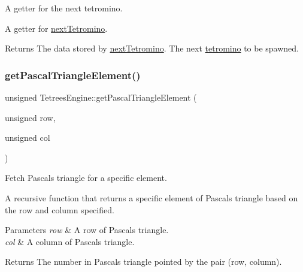 A getter for the next tetromino. 

A getter for \hyperlink{classTetreesEngine_a44c902481f5d8a72ca8a78d24f5c3a33}{next\+Tetromino}. \begin{DoxyReturn}{Returns}
The data stored by \hyperlink{classTetreesEngine_a44c902481f5d8a72ca8a78d24f5c3a33}{next\+Tetromino}. The next \hyperlink{TetreesDefs_8hpp_adf4f8e2cbbd7d8894fe3beda39db1b8f}{tetromino} to be spawned. 
\end{DoxyReturn}
\mbox{\label{classTetreesEngine_a087f12761b955478bff1d4e70e6c0549}} 
\subsubsection{\texorpdfstring{get\+Pascal\+Triangle\+Element()}{getPascalTriangleElement()}}
{\footnotesize\ttfamily unsigned Tetrees\+Engine\+::get\+Pascal\+Triangle\+Element (\begin{DoxyParamCaption}\item[{unsigned}]{row,  }\item[{unsigned}]{col }\end{DoxyParamCaption})\hspace{0.3cm}{\ttfamily [private]}}



Fetch Pascal\textquotesingle{}s triangle for a specific element. 

A recursive function that returns a specific element of Pascal\textquotesingle{}s triangle based on the row and column specified. 
\begin{DoxyParams}{Parameters}
{\em row} & A row of Pascal\textquotesingle{}s triangle. \\
\hline
{\em col} & A column of Pascal\textquotesingle{}s triangle. \\
\hline
\end{DoxyParams}
\begin{DoxyReturn}{Returns}
The number in Pascal\textquotesingle{}s triangle pointed by the pair (row, column). 
\end{DoxyReturn}
\mbox{\label{classTetreesEngine_a1f167b42fc077d496449a2cc959989ac}} 
